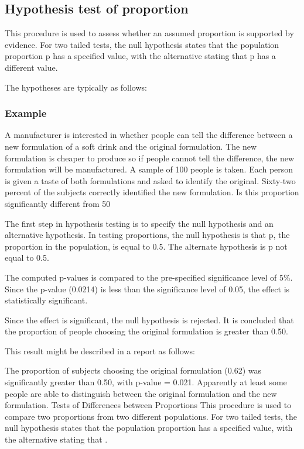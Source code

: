 \subsection{Hypothesis test of proportion}
This procedure is used to assess whether an assumed proportion is supported by evidence. For two tailed tests, the null hypothesis states that the population proportion  p has a specified value, with the alternative stating that p has a different value.

The hypotheses are typically as follows:

\subsubsection{Example}
A manufacturer is interested in whether people can tell the difference between a new formulation of a soft drink and the original formulation. The new formulation is cheaper to produce so if people cannot tell the difference, the new formulation will be manufactured. A sample of 100 people is taken. Each person is given a taste of both formulations and asked to identify the original. Sixty-two percent of the subjects correctly identified the new formulation. Is this proportion significantly different from 50%

The first step in hypothesis testing is to specify the null hypothesis and an alternative hypothesis. In testing proportions, the null hypothesis is that p, the proportion in the population, is equal to 0.5. The alternate hypothesis is p not equal to 0.5.

The computed p-values is compared to the pre-specified significance level of 5\%. Since the p-value (0.0214) is less than the significance level of 0.05, the effect is statistically significant.

Since the effect is significant, the null hypothesis is rejected. It is concluded that the proportion of people choosing the original formulation is greater than 0.50.

This result might be described in a report as follows:

    The proportion of subjects choosing the original formulation (0.62) was significantly greater than 0.50, with p-value = 0.021.
    Apparently at least some people are able to distinguish between the original formulation and the new formulation.
Tests of Differences between Proportions
This procedure is used to compare two proportions from two different populations. For two tailed tests, the null hypothesis states that the population proportion  has a specified value, with the alternative stating that .

